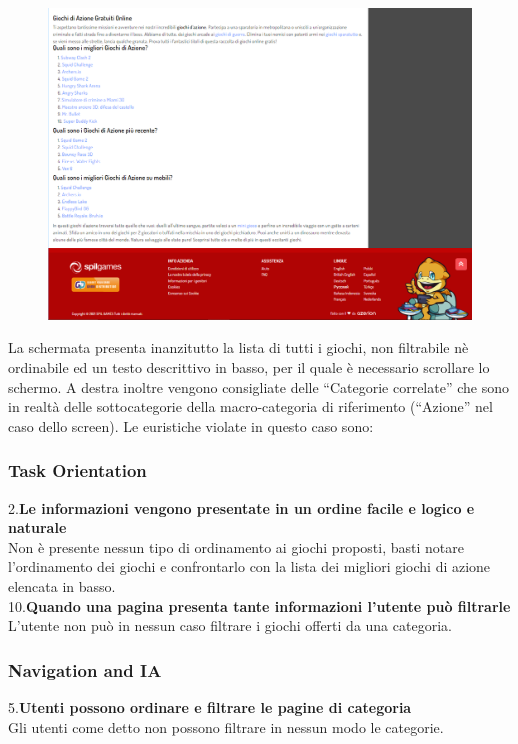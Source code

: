\documentclass[../Report.tex]{subfiles}
\begin{document}
    \begin{figure}[H]
        \includegraphics[width=\linewidth]{Assestment8.png}
        \centering
    \end{figure}
    La schermata presenta inanzitutto la lista di tutti i giochi, non filtrabile nè ordinabile ed un testo descrittivo in basso, per il quale è necessario scrollare lo schermo. A destra inoltre vengono consigliate delle “Categorie correlate” che sono in realtà delle sottocategorie della macro-categoria di riferimento (“Azione” nel caso dello screen). Le euristiche violate in questo caso sono:

    \subsubsection{Task Orientation}
    2.\textbf{Le informazioni vengono presentate in un ordine facile e logico e naturale}\\
        Non è presente nessun tipo di ordinamento ai giochi proposti, basti notare l’ordinamento dei giochi e confrontarlo con la lista dei migliori giochi di azione elencata in basso.\\

    10.\textbf{Quando una pagina presenta tante informazioni l’utente può filtrarle} \\
        L’utente non può in nessun caso filtrare i giochi offerti da una categoria.\\
    
    \subsubsection{Navigation and IA}
    5.\textbf{Utenti possono ordinare e filtrare le pagine di categoria}\\
    Gli utenti come detto non possono filtrare in nessun modo le categorie.\\
\end{document}
